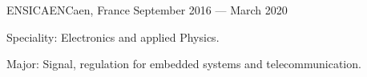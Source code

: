 
    {ENSICAEN}{Caen, France}
    {September 2016 --- March 2020}
    {\begin{additems}
        \item Speciality: Electronics and applied Physics.
        \item Major: Signal, regulation for embedded systems and telecommunication.
    \end{additems}}

%
